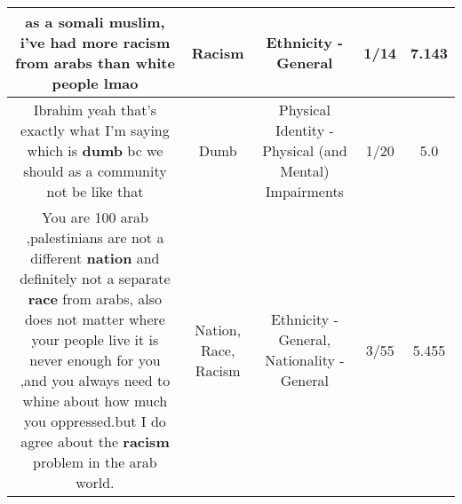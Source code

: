 \documentclass[11pt]{article}
\newlength\mylength
\begin{document}
\begin{center}
\begin{longtable}{|C{.65\mylength}|C{.30\mylength}|C{.12\mylength}|C{.12\mylength}|C{.12\mylength}|}
  \small as a somali muslim, i've had more \textbf{racism} from arabs than white people lmao\normalsize   & Racism & Ethnicity - General & 1/14 & 7.143 \\  \hline
  \small Ibrahim yeah that's exactly what I'm saying which is \textbf{dumb} bc we should as a community not be like that\normalsize   & Dumb & Physical Identity - Physical (and Mental) Impairments & 1/20 & 5.0 \\  \hline
  \small You are 100 arab ,palestinians are not a different \textbf{nation} and definitely not a separate \textbf{race} from arabs, also does not matter where your people live it is never enough for you ,and you always need to whine about how much you oppressed.but I do agree about the \textbf{racism} problem in the arab world.\normalsize   & Nation, Race, Racism & Ethnicity - General, Nationality - General & 3/55 & 5.455 \\  \hline

\end{longtable}
\end{center}
\end{document}
